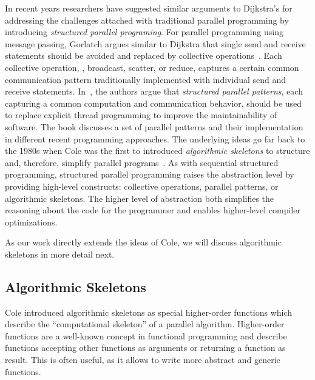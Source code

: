 In recent years researchers have suggested similar arguments to Dijkstra's for addressing the challenges attached with traditional parallel programming by introducing \emph{structured parallel programing}.
For parallel programming using message passing, Gorlatch argues similar to Dijkstra that single send and receive statements should be avoided and replaced by collective operations~\cite{Gorlatch04}.
Each collective operation, \eg, broadcast, scatter, or reduce, captures a certain common communication pattern traditionally implemented with individual send and receive statements.
In~\cite{McCoolRoRe2012}, the authors argue that \emph{structured parallel patterns}, each capturing a common computation and communication behavior, should be used to replace explicit thread programming to improve the maintainability of software.
The book discusses a set of parallel patterns and their implementation in different recent programming approaches.
The underlying ideas go far back to the 1980s when Cole was the first to introduced \emph{algorithmic skeletons} to structure and, therefore, simplify parallel programs~\cite{Cole1991}.
As with sequential structured programming, structured parallel programming raises the abstraction level by providing high-level constructs: collective operations, parallel patterns, or algorithmic skeletons.
The higher level of abstraction both simplifies the reasoning about the code for the programmer and enables higher-level compiler optimizations.

As our work directly extends the ideas of Cole, we will discuss algorithmic skeletons in more detail next.

\subsection{Algorithmic Skeletons}
Cole introduced algorithmic skeletons as special higher-order functions which describe the ``computational skeleton'' of a parallel algorithm.
Higher-order functions are a well-known concept in functional programming and describe functions accepting other functions as arguments or returning a function as result.
This is often useful, as it allows to write more abstract and generic functions.

